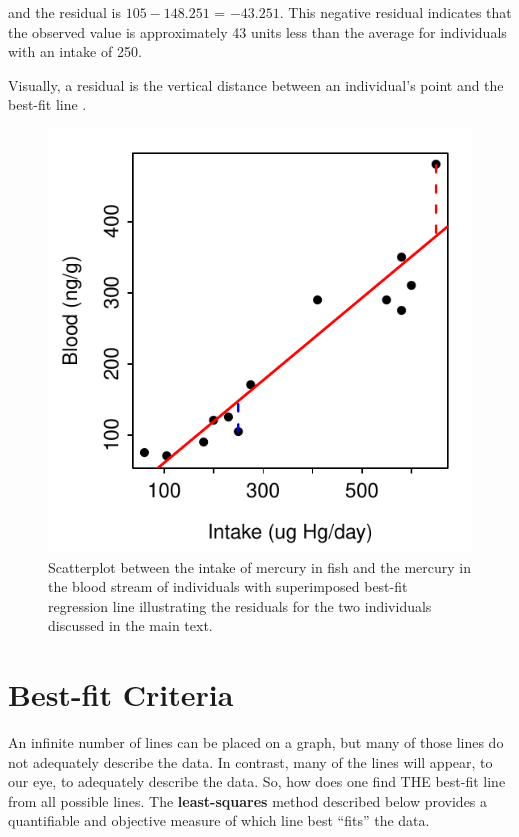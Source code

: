 \documentclass[10pt,openany]{book}\usepackage[]{graphicx}\usepackage[]{color}
\newenvironment{knitrout}{}{} %
\begin{document}
and the residual is $105-148.251$ = $-43.251$. This negative residual indicates that the observed value is approximately 43 units less than the average for individuals with an intake of 250.

Visually, a residual is the vertical distance between an individual's point and the best-fit line .

\begin{knitrout}
\color{fgcolor}\begin{figure}[hbtp]

{\centering \includegraphics[width=.4\linewidth]{Figs/HGresidual-1} 

}

\caption[Scatterplot between the intake of mercury in fish and the mercury in the blood stream of individuals with superimposed best-fit regression line illustrating the residuals for the two individuals discussed in the main text]{Scatterplot between the intake of mercury in fish and the mercury in the blood stream of individuals with superimposed best-fit regression line illustrating the residuals for the two individuals discussed in the main text.}\label{fig:HGresidual}
\end{figure}


\end{knitrout}

\section{Best-fit Criteria}\label{sect:BestFitLine}
An infinite number of lines can be placed on a graph, but many of those lines do not adequately describe the data. In contrast, many of the lines will appear, to our eye, to adequately describe the data. So, how does one find THE best-fit line from all possible lines. The \textbf{least-squares} method described below provides a quantifiable and objective measure of which line best ``fits'' the data.
\end{document}
